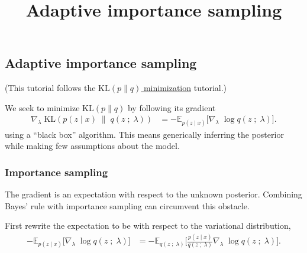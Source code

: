 \title{Adaptive importance sampling}

\subsection{Adaptive importance sampling}

(This tutorial follows the
\href{tut_KLpq.html}{$\text{KL}(p\|q)$ minimization} tutorial.)

We seek to minimize $\text{KL}(p\|q)$ by following its gradient
\begin{align*}
  \nabla_\lambda\;
  \text{KL}(
  p(z \mid x)
  \;\|\;
  q(z\;;\;\lambda)
  )
  &=
  -
  \mathbb{E}_{p(z \mid x)}
  \big[
  \nabla_\lambda\;
  \log q(z\;;\;\lambda)
  \big].
\end{align*}
using a ``black box'' algorithm. This means generically inferring the
posterior while making few assumptions about the model.

\subsubsection{Importance sampling}

The gradient is an expectation with respect to the unknown posterior. Combining
Bayes' rule with importance sampling can circumvent this obstacle.

First rewrite the expectation to be with respect to the variational
distribution,
\begin{align*}
  -
  \mathbb{E}_{p(z \mid x)}
  \big[
  \nabla_\lambda\;
  \log q(z\;;\;\lambda)
  \big]
  &=
  -
  \mathbb{E}_{q(z\;;\;\lambda)}
  \Bigg[
  \frac{p(z \mid x)}{q(z\;;\;\lambda)}
  \nabla_\lambda\;
  \log q(z\;;\;\lambda)
  \Bigg].
\end{align*}

